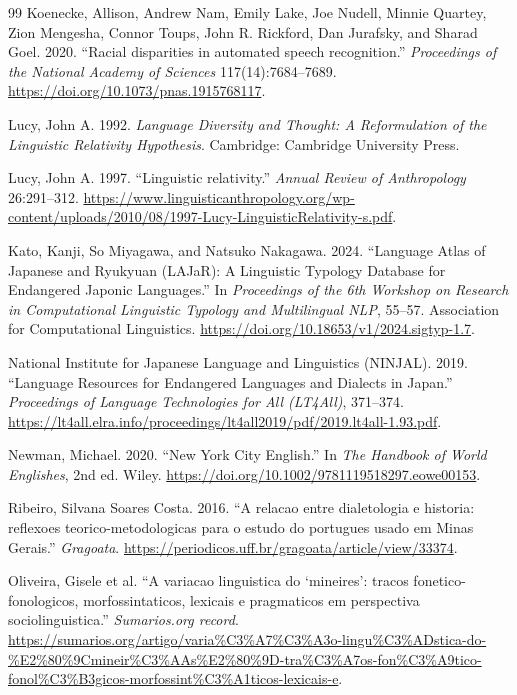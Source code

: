 \documentclass[11pt]{article}
\begin{document}
\begin{thebibliography}{99}
Koenecke, Allison, Andrew Nam, Emily Lake, Joe Nudell, Minnie Quartey, Zion
Mengesha, Connor Toups, John R. Rickford, Dan Jurafsky, and Sharad Goel. 2020.
``Racial disparities in automated speech recognition.''
\emph{Proceedings of the National Academy of Sciences} 117(14):7684--7689.
\url{https://doi.org/10.1073/pnas.1915768117}.

Lucy, John A. 1992.
\emph{Language Diversity and Thought: A Reformulation of the Linguistic
Relativity Hypothesis}.
Cambridge: Cambridge University Press.

Lucy, John A. 1997.
``Linguistic relativity.''
\emph{Annual Review of Anthropology} 26:291--312.
\url{https://www.linguisticanthropology.org/wp-content/uploads/2010/08/1997-Lucy-LinguisticRelativity-s.pdf}.

Kato, Kanji, So Miyagawa, and Natsuko Nakagawa. 2024.
``Language Atlas of Japanese and Ryukyuan (LAJaR): A Linguistic Typology
Database for Endangered Japonic Languages.''
In \emph{Proceedings of the 6th Workshop on Research in Computational
Linguistic Typology and Multilingual NLP}, 55--57.
Association for Computational Linguistics.
\url{https://doi.org/10.18653/v1/2024.sigtyp-1.7}.

National Institute for Japanese Language and Linguistics (NINJAL). 2019.
``Language Resources for Endangered Languages and Dialects in Japan.''
\emph{Proceedings of Language Technologies for All (LT4All)}, 371--374.
\url{https://lt4all.elra.info/proceedings/lt4all2019/pdf/2019.lt4all-1.93.pdf}.

Newman, Michael. 2020.
``New York City English.''
In \emph{The Handbook of World Englishes}, 2nd ed.
Wiley.
\url{https://doi.org/10.1002/9781119518297.eowe00153}.

Ribeiro, Silvana Soares Costa. 2016.
``A relacao entre dialetologia e historia: reflexoes teorico-metodologicas
para o estudo do portugues usado em Minas Gerais.''
\emph{Gragoata}.
\url{https://periodicos.uff.br/gragoata/article/view/33374}.

Oliveira, Gisele et al.
``A variacao linguistica do `mineires': tracos fonetico-fonologicos,
morfossintaticos, lexicais e pragmaticos em perspectiva sociolinguistica.''
\emph{Sumarios.org record}.
\url{https://sumarios.org/artigo/varia%C3%A7%C3%A3o-lingu%C3%ADstica-do-%E2%80%9Cmineir%C3%AAs%E2%80%9D-tra%C3%A7os-fon%C3%A9tico-fonol%C3%B3gicos-morfossint%C3%A1ticos-lexicais-e}.


\end{thebibliography}
\end{document}
